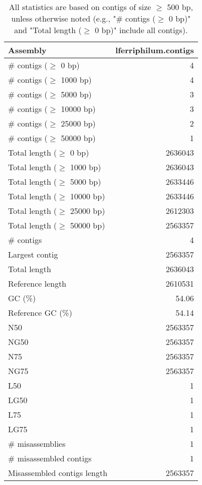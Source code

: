 \documentclass[12pt,a4paper]{article}
\begin{document}
\begin{table}[ht]
\begin{center}
\caption{All statistics are based on contigs of size $\geq$ 500 bp, unless otherwise noted (e.g., "\# contigs ($\geq$ 0 bp)" and "Total length ($\geq$ 0 bp)" include all contigs).}
\begin{tabular}{|l*{1}{|r}|}
\hline
Assembly & lferriphilum.contigs \\ \hline
\# contigs ($\geq$ 0 bp) & 4 \\ \hline
\# contigs ($\geq$ 1000 bp) & 4 \\ \hline
\# contigs ($\geq$ 5000 bp) & 3 \\ \hline
\# contigs ($\geq$ 10000 bp) & 3 \\ \hline
\# contigs ($\geq$ 25000 bp) & 2 \\ \hline
\# contigs ($\geq$ 50000 bp) & 1 \\ \hline
Total length ($\geq$ 0 bp) & 2636043 \\ \hline
Total length ($\geq$ 1000 bp) & 2636043 \\ \hline
Total length ($\geq$ 5000 bp) & 2633446 \\ \hline
Total length ($\geq$ 10000 bp) & 2633446 \\ \hline
Total length ($\geq$ 25000 bp) & 2612303 \\ \hline
Total length ($\geq$ 50000 bp) & 2563357 \\ \hline
\# contigs & 4 \\ \hline
Largest contig & 2563357 \\ \hline
Total length & 2636043 \\ \hline
Reference length & 2610531 \\ \hline
GC (\%) & 54.06 \\ \hline
Reference GC (\%) & 54.14 \\ \hline
N50 & 2563357 \\ \hline
NG50 & 2563357 \\ \hline
N75 & 2563357 \\ \hline
NG75 & 2563357 \\ \hline
L50 & 1 \\ \hline
LG50 & 1 \\ \hline
L75 & 1 \\ \hline
LG75 & 1 \\ \hline
\# misassemblies & 1 \\ \hline
\# misassembled contigs & 1 \\ \hline
Misassembled contigs length & 2563357 \\ \hline

\end{tabular}
\end{center}
\end{table}
\end{document}
